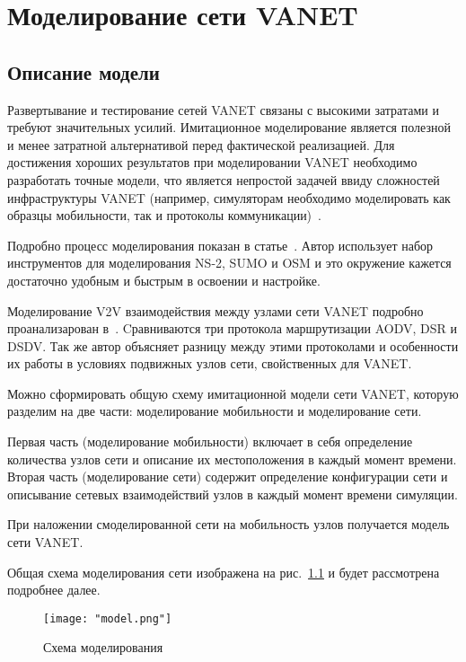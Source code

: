 \chapter{Моделирование сети VANET}

\section{Описание модели}



Развертывание и тестирование сетей VANET связаны с высокими затратами и требуют значительных усилий. Имитационное моделирование является полезной и менее затратной альтернативой перед фактической реализацией. Для достижения хороших результатов при моделировании VANET необходимо разработать точные модели, что является непростой задачей ввиду сложностей инфраструктуры VANET (например, симуляторам необходимо моделировать как образцы мобильности, так и протоколы коммуникации)~\cite{kathiriya2013traffic, raj2014simulation, hassan2009vanet}.

Подробно процесс моделирования показан в статье~\cite{seema2022simulation}. Автор использует набор инструментов для моделирования NS-2, SUMO и OSM и это окружение кажется достаточно удобным и быстрым в освоении и настройке.

Моделирование V2V взаимодействия между узлами сети VANET подробно проанализарован в~\cite{mahdi2021performance}. Cравниваются три протокола маршрутизации AODV, DSR и DSDV. Так же автор объясняет разницу между этими протоколами и особенности их работы в условиях подвижных узлов сети, свойственных для VANET.

Можно сформировать общую схему имитационной модели сети VANET, которую разделим на две части: моделирование мобильности и моделирование сети.

Первая часть (моделирование мобильности) включает в себя определение количества узлов сети и описание их местоположения в каждый момент времени.
Вторая часть (моделирование сети) содержит определение конфигурации сети и описывание сетевых взаимодействий узлов в каждый момент времени симуляции.

При наложении смоделированной сети на мобильность узлов получается модель сети VANET.

Общая схема моделирования сети изображена на рис.~\ref{fig:model} и будет рассмотрена подробнее далее.

\begin{figure}[!h]
    \centering
    \texttt{[image: "model.png"]}
    \caption{Схема моделирования}
    \label{fig:model}
\end{figure}

